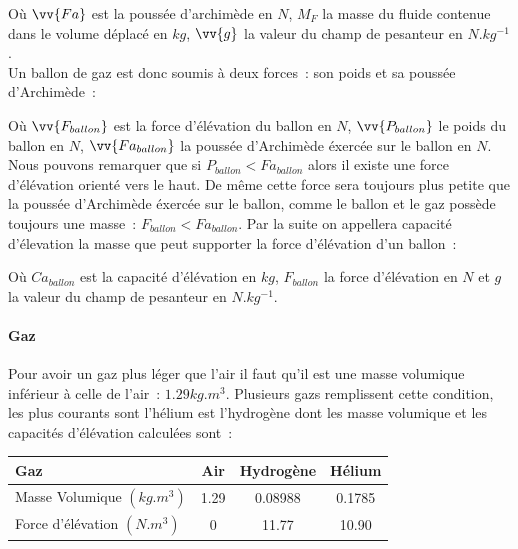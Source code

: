\documentclass[a4paper,11pt]{article}
\begin{document}
Où $\vv{Fa}$ est la poussée d'archimède en $N$, $M_F$ la masse du fluide contenue dans le volume déplacé en $kg$, $\vv{g}$ la valeur du champ de pesanteur en $N.kg^{-1}$. \\

Un ballon de gaz est donc soumis à deux forces~: son poids et sa poussée d'Archimède~:

\begin{center}
\end{center}

Où $\vv{F_{ballon}}$ est la force d'élévation du ballon en $N$, $\vv{P_{ballon}}$ le poids du ballon en $N$, $\vv{Fa_{ballon}}$ la poussée d'Archimède éxercée sur le ballon en $N$. \\

Nous pouvons remarquer que si $P_{ballon} < Fa_{ballon}$ alors il existe une force d'élévation orienté vers le haut. De même cette force sera toujours  plus petite que la poussée d'Archimède éxercée sur le ballon, comme le ballon et le gaz possède toujours une masse~: $F_{ballon} < Fa_{ballon}$.
Par la suite on appellera capacité d'élevation la masse que peut supporter la force d'élévation d'un ballon~:
\begin{center}
\end{center}

Où $Ca_{ballon}$ est la capacité d'élévation en $kg$, $F_{ballon}$ la force d'élévation en $N$ et $g$ la valeur du champ de pesanteur en $N.kg^{-1}$.

\paragraph{Gaz}

Pour avoir un gaz plus léger que l'air il faut qu'il est une masse volumique inférieur à celle de l'air~: $1.29kg.m^3$. Plusieurs gazs remplissent cette condition, les plus courants sont l'hélium est l'hydrogène dont les masse volumique et les capacités d'élévation calculées sont~:

\begin{center}
	\begin{tabular}{|l|c|c|c|}
		\hline
		Gaz & Air & Hydrogène & Hélium \\
		\hline
		Masse Volumique $(kg.m^3)$ & 1.29 & 0.08988 & 0.1785 \\
		\hline
		Force d'élévation $(N.m^3)$ & 0 & 11.77 & 10.90 \\
		\hline
	\end{tabular}
\end{center}
\end{document}
